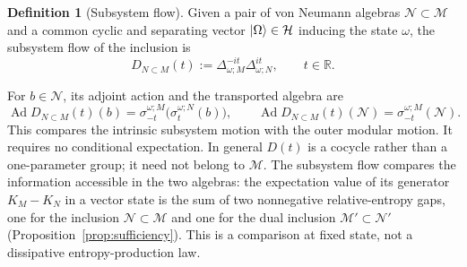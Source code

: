 \documentclass[a4paper,11pt]{article}
\theoremstyle{definition}
\newtheorem{definition}{Definition}[section]
\begin{document}
\begin{definition}[Subsystem flow]\label{def:subsystem-flow}
    Given a pair of von Neumann algebras $\mathcal N\subset\mathcal M$ and a common cyclic and separating vector $\ket{\Omega}\in\mathcal{H}$ inducing the state $\omega$, the subsystem flow of the inclusion is
    \begin{equation}
        D_{N\subset M}(t):=\Delta_{\omega;M}^{-it}\Delta_{\omega;N}^{it},\qquad t\in\mathbb R.
    \end{equation}
\end{definition}
For $b\in\mathcal N$, its adjoint action and the transported algebra are
\begin{equation}\label{eq:characteristic-algebra-transport}
 \operatorname{Ad}D_{N\subset M}(t)(b)=\sigma^{\omega;M}_{-t}\bigl(\sigma^{\omega;N}_t(b)\bigr),
 \qquad \operatorname{Ad}D_{N\subset M}(t)(\mathcal N)=\sigma^{\omega;M}_{-t}(\mathcal N).
\end{equation}
This compares the intrinsic subsystem motion with the outer modular motion.
It requires no conditional expectation. In general $D(t)$ is a cocycle rather than
a one-parameter group; it need not belong to $\mathcal M$.
The subsystem flow compares the information accessible in the two algebras: the expectation value of its generator $K_M-K_N$ in a vector state is the sum of two nonnegative relative-entropy gaps, one for the inclusion $\mathcal N\subset\mathcal M$ and one for the dual inclusion $\mathcal M'\subset\mathcal N'$ (Proposition~\ref{prop:sufficiency}). This is a comparison at fixed state, not a dissipative entropy-production law.
\end{document}
